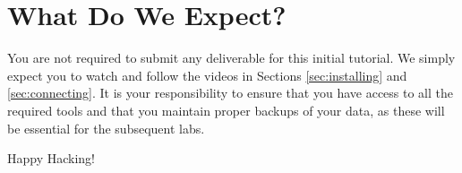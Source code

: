 \documentclass{article}
\begin{document}
\section{What Do We Expect?}
You are not required to submit any deliverable for this initial tutorial. We simply expect you to watch and follow the videos in Sections \ref{sec:installing} and \ref{sec:connecting}. It is your responsibility to ensure that you have access to all the required tools and that you maintain proper backups of your data, as these will be essential for the subsequent labs.

\vspace{5mm}
Happy Hacking! 
\end{document}
